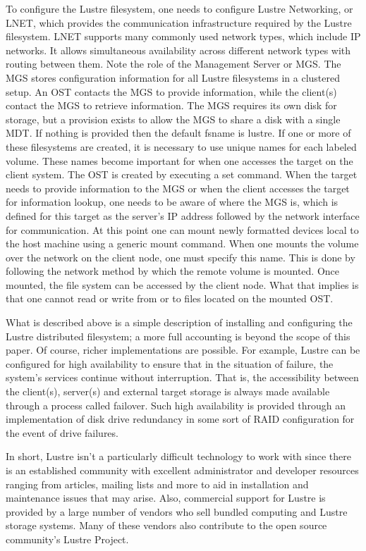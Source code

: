 \documentclass[11pt]{article}
\begin{document}
To configure the Lustre filesystem, one needs to configure Lustre Networking, 
or LNET, which provides the communication infrastructure required by the 
Lustre filesystem. LNET supports many commonly used network types, which 
include IP  networks. It allows simultaneous availability across different 
network types with routing between them. Note the role of the Management 
Server or MGS. The MGS stores configuration information for all Lustre 
filesystems in a clustered setup. An OST contacts the MGS to provide 
information, while the client(s) contact the MGS to retrieve information. 
The MGS requires its own disk for storage, but a provision exists to allow 
the MGS to share a disk with a single MDT. If nothing is provided then the 
default fsname is lustre. If one or more of these filesystems are created, 
it is necessary to use unique names for each labeled volume. These names 
become important for when one accesses the target on the client system.
The OST is created by executing a set command. When the target needs to 
provide information to the MGS or when the client accesses the target for 
information lookup, one needs to be aware of where the MGS is, which is 
defined for this target as the server's IP address followed by the network 
interface for communication. At this point one can mount newly formatted 
devices local to the host machine using a generic mount command. When one 
mounts the volume over the network on the client node, one must specify 
this name. This is done by following the network method by which the 
remote volume is mounted. Once mounted, the file system can be accessed 
by the client node. What that implies is that one cannot read or write from 
or to files located on the mounted OST. 

What is described above is a simple description of installing and 
configuring the Lustre distributed filesystem; a more full accounting 
is beyond the scope of this paper. Of course, richer implementations are 
possible. For example, Lustre can be configured for high availability to 
ensure that in the situation of failure, the system's services continue 
without interruption. That is, the accessibility between the client(s), 
server(s) and external target storage is always made available through 
a process called failover. Such high availability is provided through 
an implementation of disk drive redundancy in some sort of RAID 
configuration for the event of drive failures. 

In short, Lustre isn't a particularly difficult technology to work with 
since there is an established community with excellent administrator 
and developer resources ranging from articles, mailing lists and more 
to aid in installation and maintenance issues that may arise. Also, 
commercial support for Lustre is provided by a large number of vendors 
who sell bundled computing and Lustre storage systems. Many of these 
vendors also contribute to the open source community's Lustre Project. 
\end{document}
